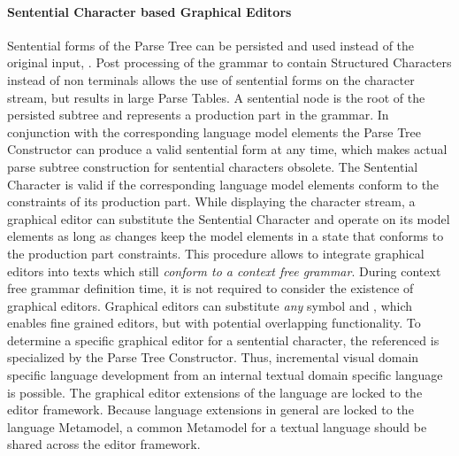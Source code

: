 \paragraph{Sentential Character based Graphical Editors}
Sentential forms of the Parse Tree can be persisted and used instead of the original input, \cite{iSW}. Post processing of the grammar to contain Structured Characters instead of non terminals allows the use of sentential forms on the character stream, but results in large Parse Tables. A sentential node is the root of the persisted subtree and represents a production part in the grammar. In conjunction with the corresponding language model elements the Parse Tree Constructor can produce a valid sentential form at any time, which makes actual parse subtree construction for sentential characters obsolete. The Sentential Character is valid if the corresponding language model elements conform to the constraints of its production part.  While displaying the character stream, a graphical editor can substitute the Sentential Character and operate on its model elements as long as changes keep the model elements in a state that conforms to the production part constraints. This procedure allows to integrate graphical editors into texts which still \emph{conform to a context free grammar}. During context free grammar definition time, it is not required to consider the existence of graphical editors. Graphical editors can substitute \emph{any} symbol and , which enables fine grained editors, but with potential overlapping functionality. To determine a specific graphical editor for a sentential character, the referenced  is specialized by the Parse Tree Constructor. Thus, incremental visual domain specific language development from an internal textual domain specific language is possible. The graphical editor extensions of the language are locked to the editor framework. Because language extensions in general are locked to the language Metamodel, a common Metamodel for a textual language should be shared across the editor framework.


